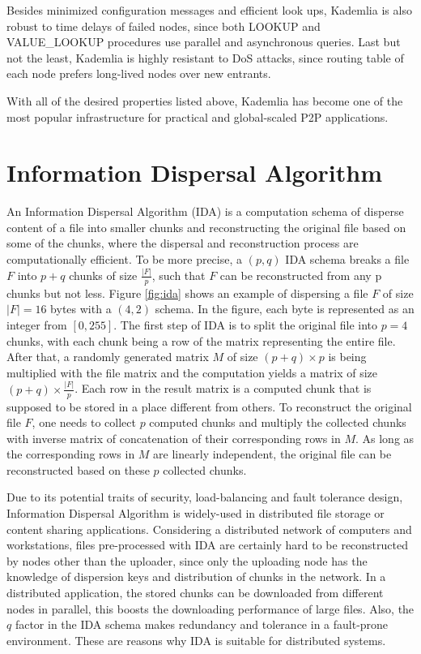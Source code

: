 Besides minimized configuration messages and efficient look ups, Kademlia is also robust to time delays of failed nodes, since both LOOKUP and VALUE\_LOOKUP procedures use parallel and asynchronous queries. Last but not the least, Kademlia is highly resistant to DoS attacks, since routing table of each node prefers long-lived nodes over new entrants.

With all of the desired properties listed above, Kademlia has become one of the most popular infrastructure for practical and global-scaled P2P applications.

\newpage

\section{Information Dispersal Algorithm}
\label{s:informationdispersalalgorithm}

An Information Dispersal Algorithm (IDA)\cite{rabin1989efficient} is a computation schema of disperse content of a file into smaller chunks and reconstructing the original file based on some of the chunks, where the dispersal and reconstruction process are computationally efficient. To be more precise, a $(p,q)$ IDA schema breaks a file $F$ into $p+q$ chunks of size $\frac{|F|}{p}$, such that $F$ can be reconstructed from any p chunks but not less. Figure \ref{fig:ida} shows an example of dispersing a file $F$ of size $|F|=16$ bytes with a $(4,2)$ schema. In the figure, each byte is represented as an integer from $[0, 255]$. The first step of IDA is to split the original file into $p=4$ chunks, with each chunk being a row of the matrix representing the entire file. After that, a randomly generated matrix $M$ of size $(p+q)\times p$ is being multiplied with the file matrix and the computation yields a matrix of size $(p+q)\times \frac{|F|}{p}$. Each row in the result matrix is a computed chunk that is supposed to be stored in a place different from others. To reconstruct the original file $F$, one needs to collect $p$ computed chunks and multiply the collected chunks with inverse matrix of concatenation of their corresponding rows in $M$. As long as the corresponding rows in $M$ are linearly independent, the original file can be reconstructed based on these $p$ collected chunks.

Due to its potential traits of security, load-balancing and fault tolerance design, Information Dispersal Algorithm is widely-used in distributed file storage or content sharing applications. Considering a distributed network of computers and workstations, files pre-processed with IDA are certainly hard to be reconstructed by nodes other than the uploader, since only the uploading node has the knowledge of dispersion keys and distribution of chunks in the network. In a distributed application, the stored chunks can be downloaded from different nodes in parallel, this boosts the downloading performance of large files.  Also, the $q$ factor in the IDA schema makes redundancy and tolerance in a fault-prone environment. These are reasons why IDA is suitable for distributed systems.

